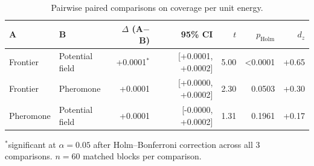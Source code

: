 \begin{table}[t]
\centering
\caption{Pairwise paired comparisons on coverage per unit energy.}
\label{tab:paired-cpe}
\small
\begin{tabular}{llrrrrr}
\toprule
A & B & $\Delta$ (A$-$B) & 95\% CI & $t$ & $p_{\mathrm{Holm}}$ & $d_z$ \\
\midrule
Frontier & Potential field & +0.0001$^{*}$ & [+0.0001, +0.0002] & 5.00 & <0.0001 & +0.65 \\
Frontier & Pheromone & +0.0001 & [+0.0000, +0.0002] & 2.30 & 0.0503 & +0.30 \\
Pheromone & Potential field & +0.0001 & [-0.0000, +0.0002] & 1.31 & 0.1961 & +0.17 \\
\bottomrule
\end{tabular}
\par\vspace{2pt}\footnotesize $^{*}$significant at $\alpha=0.05$ after Holm--Bonferroni correction across all 3 comparisons. $n=60$ matched blocks per comparison.
\end{table}
